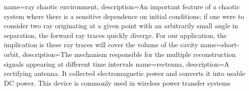 {
   name=ray chaotic environment,
  description={An important feature of a chaotic system where there is a sensitive dependence on initial conditions; if one were to consider two ray originating at a given point with an arbitrarily small angle in separation, the forward ray traces quickly diverge. For our application, the implication is these ray traces will cover the volume of the cavity}
}
{
   name=short-orbit,
  description={The mechanism responsible for the multiple reconstruction signals appearing at different time intervals}
}
{
   name=rectenna,
  description={A rectifying antenna. It collected electromagnetic power and converts it into usable DC power. This device is commonly used in wireless power transfer systems}
}

